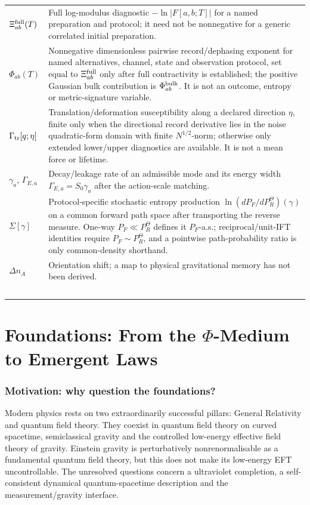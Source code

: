 \documentclass[11pt,a4paper]{article}
\begin{document}
\begin{longtable}{@{}p{2.6cm}p{12.6cm}@{}}
$\Xi_{ab}^{\rm full}(T)$ & Full log-modulus diagnostic $-\ln|F[a,b;T]|$ for a named preparation and protocol; it need not be nonnegative for a generic correlated initial preparation. \\
$\Phi_{ab}(T)$ & Nonnegative dimensionless pairwise record/dephasing exponent for named alternatives, channel, state and observation protocol, set equal to $\Xi_{ab}^{\rm full}$ only after full contractivity is established; the positive Gaussian bulk contribution is $\Phi_{ab}^{\rm bulk}$.  It is not an outcome, entropy or metric-signature variable. \\
$\Gamma_{\rm tr}[q;\eta]$ & Translation/deformation susceptibility along a declared direction $\eta$, finite only when the directional record derivative lies in the noise quadratic-form domain with finite $N^{1/2}$-norm; otherwise only extended lower/upper diagnostics are available.  It is not a mean force or lifetime. \\
$\gamma_a$, $\Gamma_{E,a}$ & Decay/leakage rate of an admissible mode and its energy width $\Gamma_{E,a}=S_0\gamma_a$ after the action-scale matching. \\
$\Sigma[\gamma]$ & Protocol-specific stochastic entropy production $\ln(dP_F/dP_R^\Theta)(\gamma)$ on a common forward path space after transporting the reverse measure. One-way $P_F\ll P_R^\Theta$ defines it $P_F$-a.s.; reciprocal/unit-IFT identities require $P_F\sim P_R^\Theta$, and a pointwise path-probability ratio is only common-density shorthand. \\
$\Delta n_A$ & Orientation shift; a map to physical gravitational memory has not been derived. \\\
\end{longtable}
\endgroup

\newpage
\part{Foundations: From the $\Phi$-Medium to Emergent Laws}
\label{part:foundations_pop}

\section{Motivation: why question the foundations?}
\label{sec:pop_motivation}

Modern physics rests on two extraordinarily successful pillars: General
Relativity and quantum field theory.  They coexist in quantum field theory
on curved spacetime, semiclassical gravity and the controlled low-energy
effective field theory of gravity.  Einstein gravity is perturbatively
nonrenormalisable as a fundamental quantum field theory, but this does not
make its low-energy EFT uncontrollable.  The unresolved questions concern a
ultraviolet completion, a self-consistent dynamical quantum-spacetime
description and the measurement/gravity interface.
\end{document}
